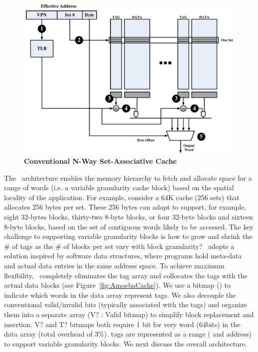 \begin{figure}[h]
  \begin{center}
    \includegraphics[width=\textwidth]{files/Figures/06-NWaySetAssocCache.pdf}
    \caption[Conventional N-Way Set-Associative Cache]{\textbf{Conventional N-Way Set-Associative Cache} \newline 
      }
    \label{fig:set_assoc_arch}
  \end{center}
\end{figure}


The \AC\ architecture enables the memory hierarchy to fetch and allocate space
for a range of words (i.e. a variable granularity cache block) based on the spatial
locality of the application.  For example, consider a 64K cache (256 sets)
that allocates 256 bytes per set. These 256 bytes can adapt to support, for
example, eight 32-bytes blocks, thirty-two 8-byte blocks, or four 32-byte
blocks and sixteen 8-byte blocks, based on the set of contiguous words likely
to be accessed. The key challenge to supporting variable granularity blocks
is how to grow and shrink the \# of tags as the \# of blocks per set vary with
block granularity? \AC\ adopts a solution inspired by software data
structures, where programs hold meta-data and actual data entries in the same
address space.  To achieve maximum flexibility, \AC\ completely eliminates the
tag array and collocates the tags with the actual data blocks (see
Figure~\ref{fig:AmoebaCache}). We use a bitmap () to indicate
which words in the data array represent tags. We also decouple the
conventional valid/invalid bits (typically associated with the tags) and
organize them into a separate array (V? : Valid bitmap) to simplify block
replacement and insertion. V? and T?  bitmaps both require 1 bit for very word
(64bits) in the data array (total overhead of 3\%). \AC{} tags are represented
as a range ( and  address) to support variable
granularity blocks.  We next discuss the overall architecture.

